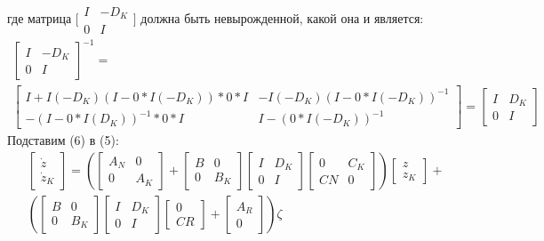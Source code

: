 где матрица $\bigl[ \begin{smallmatrix}  {I} & -{D}_K \\ 0 & {I} \end{smallmatrix} \bigr]$ должна быть невырожденной, какой она и является:
\begin{equation}
	\begin{gathered}
		\begin{bmatrix}
			{I} & -{D}_K \\ 0 & {I}
		\end{bmatrix}^{-1} = 
		\\
		\begin{bmatrix}
			{I} + {I}(-{D}_K)({I}-0*{I}(-{D}_K))*0*{I} & -{I}(-{D}_K)({I}-0*{I}(-{D}_K))^{-1}\\
			-({I} - 0*{I}({D}_K))^{-1}*0*{I} &
			{I}-(0*{I}(-{D}_K))^{-1}
		\end{bmatrix}= 
		\begin{bmatrix}
			{I} & {D}_K \\ 0 & {I}
		\end{bmatrix}
	\end{gathered}
\end{equation}
Подставим (6) в (5):
\begin{align}
	& \begin{bmatrix}
		{\dot{z}} \\ {\dot{z}}_K 
	\end{bmatrix}
	=\left(
	\begin{bmatrix}
		{A}_N & 0 \\
		0 & {A}_K
	\end{bmatrix}
	+
	\begin{bmatrix}
		{B} & 0 \\
		0 & {B}_K
	\end{bmatrix}
	\begin{bmatrix}
		{I} & {D}_K \\
		0 & {I}
	\end{bmatrix}
	\begin{bmatrix}
		0 & {C}_K \\
		{C}{N} & 0
	\end{bmatrix}
	\right)
	\begin{bmatrix}
		{z} \\ {z}_K
	\end{bmatrix}
	+ \\
	& \left(
	\begin{bmatrix}
		{B} & 0 \\
		0 & {B}_K
	\end{bmatrix}
	\begin{bmatrix}
		{I} & {D}_K \\
		0 & {I}
	\end{bmatrix}
	\begin{bmatrix}
		0 \\ {C}{R}
	\end{bmatrix}
	+
	\begin{bmatrix}
		{A}_R \\ 0 
	\end{bmatrix}\right)
	{\zeta}
\end{align}
